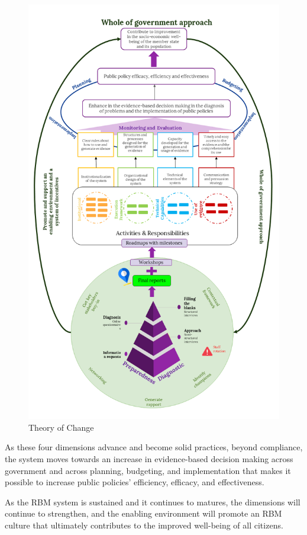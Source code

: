 \documentclass[
  10pt,
]{book}
\begin{document}
\begin{figure}
\includegraphics[width=1\linewidth]{./images/figure_1} \caption{Theory of Change}\label{fig:figure1}
\end{figure}

As these four dimensions advance and become solid practices, beyond compliance, the system moves towards an increase in evidence-based decision making across government and across planning, budgeting, and implementation that makes it possible to increase public policies' efficiency, efficacy, and effectiveness.

As the RBM system is sustained and it continues to matures, the dimensions will continue to strengthen, and the enabling environment will promote an RBM culture that ultimately contributes to the improved well-being of all citizens.
\end{document}
